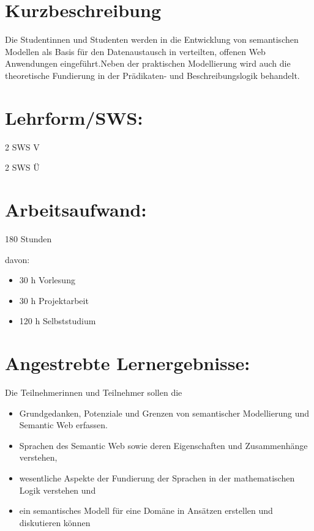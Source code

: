\section*{Kurzbeschreibung}\label{kurzbeschreibung-16}

Die Studentinnen und Studenten werden in die Entwicklung von
semantischen Modellen als Basis für den Datenaustausch in verteilten,
offenen Web Anwendungen eingeführt.Neben der praktischen Modellierung
wird auch die theoretische Fundierung in der Prädikaten- und
Beschreibungslogik behandelt.

\section*{Lehrform/SWS:}\label{lehrformsws-21}

2 SWS V

2 SWS Ü

\section*{Arbeitsaufwand:}\label{arbeitsaufwand-26}

180 Stunden

davon:

\begin{itemize}
\tightlist
\item
  30 h Vorlesung
\item
  30 h Projektarbeit
\item
  120 h Selbststudium
\end{itemize}

\section*{Angestrebte
Lernergebnisse:}\label{angestrebte-lernergebnisse-20}

Die Teilnehmerinnen und Teilnehmer sollen die

\begin{itemize}
\tightlist
\item
  Grundgedanken, Potenziale und Grenzen von semantischer Modellierung
  und Semantic Web erfassen.
\item
  Sprachen des Semantic Web sowie deren Eigenschaften und Zusammenhänge
  verstehen,
\item
  wesentliche Aspekte der Fundierung der Sprachen in der mathematischen
  Logik verstehen und
\item
  ein semantisches Modell für eine Domäne in Ansätzen erstellen und
  diskutieren können
\end{itemize}


